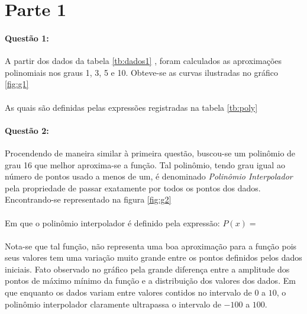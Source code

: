 \documentclass[a4paper,11pt]{article}
\title{\tituloCapa}
\begin{document}


\section{Parte 1}
\paragraph{Questão 1:}A partir dos dados da tabela \ref{tb:dados1} , foram calculados as aproximações polinomiais nos graus 1, 3, 5 e 10. Obteve-se as curvas ilustradas no gráfico \ref{fig:g1}
\paragraph{}As quais são definidas pelas expressões registradas na tabela \ref{tb:poly}


\paragraph{Questão 2:}Procendendo de maneira similar à primeira questão, buscou-se um polinômio de grau 16 que melhor aproxima-se a função. Tal polinômio, tendo grau igual ao número de pontos usado a menos de um, é denominado \textit{Polinômio Interpolador} pela propriedade de passar exatamente por todos os pontos dos dados. Encontrando-se representado na figura \ref{fig:g2}


\paragraph{}Em que o polinômio interpolador é definido pela expressão:
{$P(x) =$\  \centering}
\paragraph{}Nota-se que tal função, não representa uma boa aproximação para a função pois seus valores tem uma variação muito grande entre os pontos definidos pelos dados iniciais. Fato observado no gráfico pela grande diferença entre a amplitude dos pontos de máximo mínimo da função e a distribuição dos valores dos dados. Em que enquanto os dados variam entre valores contidos no intervalo de $0$ a $10$, o polinômio interpolador claramente ultrapassa o intervalo de $-100$ a $100$.
\end{document}
